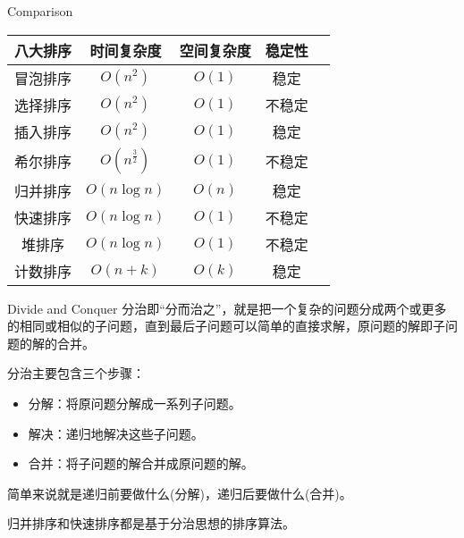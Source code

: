 \documentclass{ldr-simple-gray}
\begin{document}
  \begin{frame}{Comparison}
    \begin{table}
      \centering
      \begin{tabular}{|c|c|c|c|c|}
        \hline
        八大排序 & 时间复杂度 & 空间复杂度 & 稳定性 \\
        \hline
        冒泡排序 & $O(n^2)$ & $O(1)$ & 稳定 \\
        选择排序 & $O(n^2)$ & $O(1)$ & 不稳定 \\
        插入排序 & $O(n^2)$ & $O(1)$ & 稳定 \\
        希尔排序 & $O(n^{\frac{3}{2}})$ & $O(1)$ & 不稳定 \\
        归并排序 & $O(n\log n)$ & $O(n)$ & 稳定 \\
        快速排序 & $O(n\log n)$ & $O(1)$ & 不稳定 \\
        堆排序 & $O(n\log n)$ & $O(1)$ & 不稳定 \\
        计数排序 & $O(n+k)$ & $O(k)$ & 稳定 \\
        \hline
      \end{tabular}
    \end{table}
  \end{frame}

  \begin{frame}{Divide and Conquer}
    分治即“分而治之”，就是把一个复杂的问题分成两个或更多的相同或相似的子问题，直到最后子问题可以简单的直接求解，原问题的解即子问题的解的合并。\newline

    分治主要包含三个步骤：
    \begin{itemize}
      \item 分解：将原问题分解成一系列子问题。
      \item 解决：递归地解决这些子问题。
      \item 合并：将子问题的解合并成原问题的解。
    \end{itemize}

    简单来说就是递归前要做什么(分解)，递归后要做什么(合并)。\newline

    归并排序和快速排序都是基于分治思想的排序算法。
  \end{frame}
\end{document}
